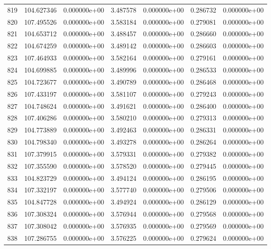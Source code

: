 \begin{tabular}{rrrrrrr}
 819 & 104.627346 &  0.000000e+00 &  3.487578 &  0.000000e+00 &    0.286732 &  0.000000e+00 \\
 820 & 107.495526 &  0.000000e+00 &  3.583184 &  0.000000e+00 &    0.279081 &  0.000000e+00 \\
 821 & 104.653712 &  0.000000e+00 &  3.488457 &  0.000000e+00 &    0.286660 &  0.000000e+00 \\
 822 & 104.674259 &  0.000000e+00 &  3.489142 &  0.000000e+00 &    0.286603 &  0.000000e+00 \\
 823 & 107.464933 &  0.000000e+00 &  3.582164 &  0.000000e+00 &    0.279161 &  0.000000e+00 \\
 824 & 104.699885 &  0.000000e+00 &  3.489996 &  0.000000e+00 &    0.286533 &  0.000000e+00 \\
 825 & 104.723677 &  0.000000e+00 &  3.490789 &  0.000000e+00 &    0.286468 &  0.000000e+00 \\
 826 & 107.433197 &  0.000000e+00 &  3.581107 &  0.000000e+00 &    0.279243 &  0.000000e+00 \\
 827 & 104.748624 &  0.000000e+00 &  3.491621 &  0.000000e+00 &    0.286400 &  0.000000e+00 \\
 828 & 107.406286 &  0.000000e+00 &  3.580210 &  0.000000e+00 &    0.279313 &  0.000000e+00 \\
 829 & 104.773889 &  0.000000e+00 &  3.492463 &  0.000000e+00 &    0.286331 &  0.000000e+00 \\
 830 & 104.798340 &  0.000000e+00 &  3.493278 &  0.000000e+00 &    0.286264 &  0.000000e+00 \\
 831 & 107.379915 &  0.000000e+00 &  3.579331 &  0.000000e+00 &    0.279382 &  0.000000e+00 \\
 832 & 107.355590 &  0.000000e+00 &  3.578520 &  0.000000e+00 &    0.279445 &  0.000000e+00 \\
 833 & 104.823729 &  0.000000e+00 &  3.494124 &  0.000000e+00 &    0.286195 &  0.000000e+00 \\
 834 & 107.332197 &  0.000000e+00 &  3.577740 &  0.000000e+00 &    0.279506 &  0.000000e+00 \\
 835 & 104.847728 &  0.000000e+00 &  3.494924 &  0.000000e+00 &    0.286129 &  0.000000e+00 \\
 836 & 107.308324 &  0.000000e+00 &  3.576944 &  0.000000e+00 &    0.279568 &  0.000000e+00 \\
 837 & 107.308042 &  0.000000e+00 &  3.576935 &  0.000000e+00 &    0.279569 &  0.000000e+00 \\
 838 & 107.286755 &  0.000000e+00 &  3.576225 &  0.000000e+00 &    0.279624 &  0.000000e+00 \\

\end{tabular}
